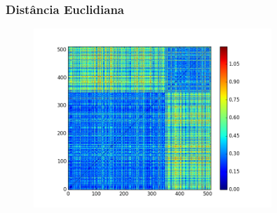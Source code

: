 \documentclass{beamer}
\begin{document}
\begin{frame}
\frametitle{Distância Euclidiana}
\begin{figure}[H]
    \centering
    \includegraphics[width=0.8\textwidth]{../img/distance_zscore_clean.png}
    \label{fig:corrcoef}
\end{figure}
\end{frame}
\end{document}
